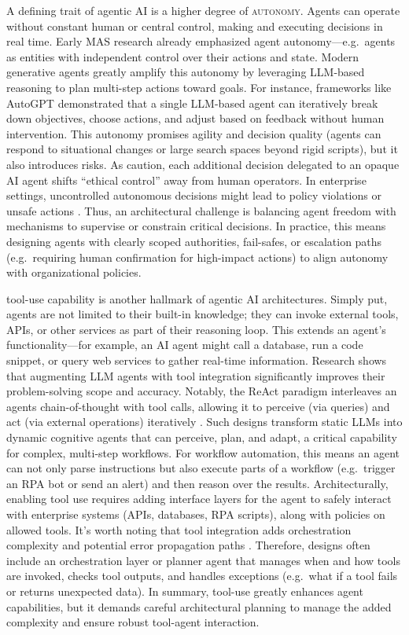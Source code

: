 A defining trait of agentic AI is a higher degree of \textsc{autonomy}. Agents can operate without constant human or central control, making and executing decisions in real time. Early MAS research already emphasized agent autonomy—e.g.~agents as entities with independent control over their actions and state. Modern generative agents greatly amplify this autonomy by leveraging LLM-based reasoning to plan multi-step actions toward goals. For instance, frameworks like AutoGPT \parencite{yangAutoGPT2023} demonstrated that a single LLM-based agent can iteratively break down objectives, choose actions, and adjust based on feedback without human intervention. This autonomy promises agility and decision quality (agents can respond to situational changes or large search spaces beyond rigid scripts), but it also introduces risks. As \textcite{russellResearch2015} caution, each additional decision delegated to an opaque AI agent shifts “ethical control” away from human operators. In enterprise settings, uncontrolled autonomous decisions might lead to policy violations or unsafe actions \parencite{gauravGovernance2025}. Thus, an architectural challenge is balancing agent freedom with mechanisms to supervise or constrain critical decisions. In practice, this means designing agents with clearly scoped authorities, fail-safes, or escalation paths (e.g.~requiring human confirmation for high-impact actions) to align autonomy with organizational policies.

tool-use capability is another hallmark of agentic AI architectures. Simply put, agents are not limited to their built-in knowledge; they can invoke external tools, APIs, or other services as part of their reasoning loop. This extends an agent's functionality—for example, an AI agent might call a database, run a code snippet, or query web services to gather real-time information. Research shows that augmenting LLM agents with tool integration significantly improves their problem-solving scope and accuracy. Notably, the ReAct paradigm interleaves an agents chain-of-thought with tool calls, allowing it to perceive (via queries) and act (via external operations) iteratively \parencite{yaoReAct2023}. Such designs transform static LLMs into dynamic cognitive agents that can perceive, plan, and adapt, a critical capability for complex, multi-step workflows. For workflow automation, this means an agent can not only parse instructions but also execute parts of a workflow (e.g.~trigger an RPA bot or send an alert) and then reason over the results. Architecturally, enabling tool use requires adding interface layers for the agent to safely interact with enterprise systems (APIs, databases, RPA scripts), along with policies on allowed tools. It's worth noting that tool integration adds orchestration complexity and potential error propagation paths \parencite{sapkotaAI2026}. Therefore, designs often include an orchestration layer or planner agent that manages when and how tools are invoked, checks tool outputs, and handles exceptions (e.g.~what if a tool fails or returns unexpected data). In summary, tool-use greatly enhances agent capabilities, but it demands careful architectural planning to manage the added complexity and ensure robust tool-agent interaction.

